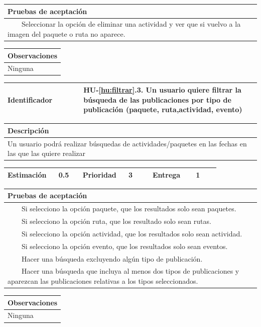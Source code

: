 \documentclass[11pt]{article}
\newcommand{\tabitem}{~~\llap{\textbullet}~~}
\begin{document}
\begin{longtable}{p{1.028\linewidth}}
	\textbf{Pruebas de aceptación}\\
	\midrule
	\tabitem Seleccionar la opción de eliminar una actividad y ver que si vuelvo a la imagen del paquete o ruta no aparece.\\
\end{longtable}
\begin{longtable}{p{1.028\linewidth}}
	\textbf{Observaciones}\\
	\midrule
	Ninguna\\
	\bottomrule
	\bottomrule
\end{longtable}

\centering
\begin{longtable}{p{0.3\linewidth}|p{0.7\linewidth}}
	\toprule
	\toprule
	\textbf{Identificador} & \textbf{HU-\ref{hu:filtrar}.3}. Un usuario quiere filtrar la búsqueda de las publicaciones por tipo de publicación (paquete, ruta,actividad, evento)\\
	
	\bottomrule
\end{longtable}

\begin{longtable}{p{1.028\linewidth}}
	\textbf{Descripción}\\
	\midrule
	Un usuario podrá realizar búsquedas de actividades/paquetes en las fechas en las que las quiere realizar
\end{longtable}
\begin{longtable}{p{0.18\linewidth}|p{0.1\linewidth}|p{0.18\linewidth}|p{0.1\linewidth}|p{0.18\linewidth}|p{0.1\linewidth}}
	\toprule
	\textbf{Estimación} & 0.5 & \textbf{Prioridad} & 3 & \textbf{Entrega} & 1 \\
	\bottomrule
\end{longtable}

\begin{longtable}{p{1.028\linewidth}}
	\textbf{Pruebas de aceptación}\\
	\midrule
	\tabitem Si selecciono la opción paquete, que los resultados solo sean paquetes.\\
	\tabitem Si selecciono la opción ruta, que los resultado solo sean rutas.\\
	\tabitem Si selecciono la opción actividad, que los resultados solo sean actividad.\\
	\tabitem Si selecciono la opción evento, que los resultados solo sean eventos.\\
	\tabitem Hacer una búsqueda excluyendo algún tipo de publicación.\\
	\tabitem Hacer una búsqueda que incluya al menos dos tipos de publicaciones y aparezcan las publicaciones relativas a los tipos seleccionados.\\
\end{longtable}
\begin{longtable}{p{1.028\linewidth}}
	\textbf{Observaciones}\\
	\midrule
	Ninguna\\
	\bottomrule
	\bottomrule
\end{longtable}
\end{document}
